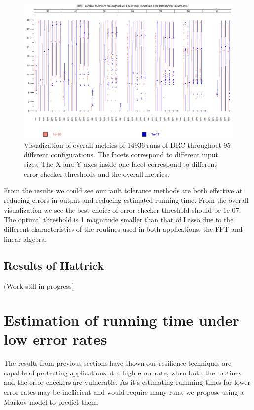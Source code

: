 \documentclass{article}
\begin{document}
\begin{figure}[h!]
\begin{center}
\includegraphics[width=16cm,natwidth=1160,natheight=744]{Overall_Metric_DRC.png}
\end{center}
\caption{Visualization of overall metrics of 14936 runs of DRC throughout 95 different configurations. The facets correspond to different input sizes. The X and Y axes inside one facet correspond to different error checker thresholds and the overall metrics.}
\end{figure}

From the results we could see our fault tolerance methods are both effective at reducing errors in output and reducing estimated running time. From the overall visualization we see the best choice of error checker threshold should be 1e-07. The optimal threshold is 1 magnitude smaller than that of Lasso due to the different characteristics of the routines used in both applications, the FFT and linear algebra.

\subsection{Results of Hattrick}

(Work still in progress)

\section{Estimation of running time under low error rates}

The results from previous sections have shown our resilience techniques are capable of protecting applications at a high error rate, when both the routines and the error checkers are vulnerable. As it's estimating runnning times for lower error rates may be inefficient and would require many runs, we propose using a Markov model to predict them.
\end{document}
